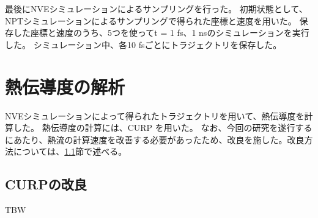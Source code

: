 最後にNVEシミュレーションによるサンプリングを行った。
初期状態として、NP\gamma Tシミュレーションによるサンプリングで得られた座標と速度を用いた。
保存した座標と速度のうち、5つを使って\Delta t = 1 fs、1 nsのシミュレーションを実行した。
シミュレーション中、各10 fsごとにトラジェクトリを保存した。

\section{熱伝導度の解析}

NVEシミュレーションによって得られたトラジェクトリを用いて、熱伝導度を計算した。
熱伝導度の計算には、CURP\autocite{ishikura_energy_2015,ota_energy_2019,yamatoComputationalStudyThermal2022,wangSiteselectiveHeatCurrent2023} を用いた。
なお、今回の研究を遂行するにあたり、熱流の計算速度を改善する必要があったため、改良を施した。改良方法については、\ref{sec:curp}節で述べる。



\subsection{CURPの改良}\label{sec:curp}

TBW
